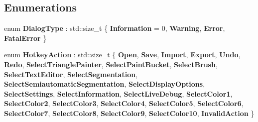 \subsection*{Enumerations}
\begin{DoxyCompactItemize}
\item 
\mbox{\label{namespacepepr3d_ab78be750c70b46ae3d2dd03e440d4acc}} 
enum {\bfseries Dialog\+Type} \+: std\+::size\+\_\+t \{ {\bfseries Information} = 0, 
{\bfseries Warning}, 
{\bfseries Error}, 
{\bfseries Fatal\+Error}
 \}
\item 
\mbox{\label{namespacepepr3d_ae35d8dfd4e5925d633f100eb9b525cbe}} 
enum {\bfseries Hotkey\+Action} \+: std\+::size\+\_\+t \{ \newline
{\bfseries Open}, 
{\bfseries Save}, 
{\bfseries Import}, 
{\bfseries Export}, 
\newline
{\bfseries Undo}, 
{\bfseries Redo}, 
{\bfseries Select\+Triangle\+Painter}, 
{\bfseries Select\+Paint\+Bucket}, 
\newline
{\bfseries Select\+Brush}, 
{\bfseries Select\+Text\+Editor}, 
{\bfseries Select\+Segmentation}, 
{\bfseries Select\+Semiautomatic\+Segmentation}, 
\newline
{\bfseries Select\+Display\+Options}, 
{\bfseries Select\+Settings}, 
{\bfseries Select\+Information}, 
{\bfseries Select\+Live\+Debug}, 
\newline
{\bfseries Select\+Color1}, 
{\bfseries Select\+Color2}, 
{\bfseries Select\+Color3}, 
{\bfseries Select\+Color4}, 
\newline
{\bfseries Select\+Color5}, 
{\bfseries Select\+Color6}, 
{\bfseries Select\+Color7}, 
{\bfseries Select\+Color8}, 
\newline
{\bfseries Select\+Color9}, 
{\bfseries Select\+Color10}, 
{\bfseries Invalid\+Action}
 \}
\end{DoxyCompactItemize}
